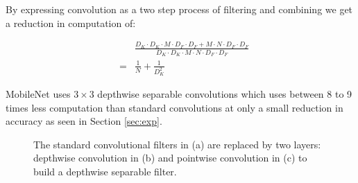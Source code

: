 \documentclass[10pt,twocolumn,letterpaper]{article}
\begin{document}
By expressing convolution as a two step process of filtering and combining we get a reduction in computation of:

\begin{eqnarray*}
&&\frac{D_K \cdot D_K \cdot M \cdot D_F \cdot D_F +  M \cdot N \cdot D_F \cdot D_F}{D_K \cdot D_K \cdot M \cdot N \cdot D_F \cdot D_F} \\
&=&\frac{1}{N} + \frac{1}{D_K^2}
\end{eqnarray*}

MobileNet uses $3 \times 3$ depthwise separable convolutions which uses between 8 to 9 times less computation than standard convolutions at only a small reduction in accuracy as seen in Section \ref{sec:exp}.

\begin{figure}[t]
\centering
{}

\caption{The standard convolutional filters in (a) are replaced by two layers: depthwise convolution in (b) and pointwise convolution in (c) to build a depthwise separable filter.}
\label{fig:dw_conv}
\end{figure}
\end{document}
